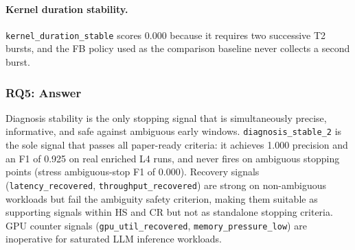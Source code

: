 \paragraph{Kernel duration stability.}
\texttt{kernel\_duration\_stable} scores 0.000 because it requires two successive T2 bursts, and the \textsc{FB} policy used as the comparison baseline never collects a second burst.

\subsubsection{RQ5: Answer}

Diagnosis stability is the only stopping signal that is simultaneously precise, informative, and safe against ambiguous early windows. \texttt{diagnosis\_stable\_2} is the sole signal that passes all paper-ready criteria: it achieves 1.000 precision and an F1 of 0.925 on real enriched L4 runs, and never fires on ambiguous stopping points (stress ambiguous-stop F1 of 0.000). Recovery signals (\texttt{latency\_recovered}, \texttt{throughput\_recovered}) are strong on non-ambiguous workloads but fail the ambiguity safety criterion, making them suitable as supporting signals within \textsc{HS} and \textsc{CR} but not as standalone stopping criteria. GPU counter signals (\texttt{gpu\_util\_recovered}, \texttt{memory\_pressure\_low}) are inoperative for saturated LLM inference workloads.